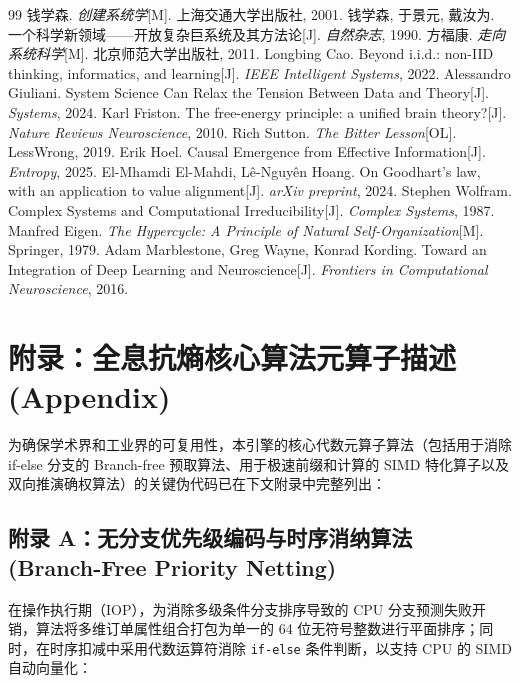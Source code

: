 \documentclass[11pt,a4paper]{article}
\begin{document}
\begin{thebibliography}{99}
 钱学森. \emph{创建系统学}[M]. 上海交通大学出版社, 2001.
 钱学森, 于景元, 戴汝为. 一个科学新领域——开放复杂巨系统及其方法论[J]. \emph{自然杂志}, 1990.
 方福康. \emph{走向系统科学}[M]. 北京师范大学出版社, 2011.
 Longbing Cao. Beyond i.i.d.: non-IID thinking, informatics, and learning[J]. \emph{IEEE Intelligent Systems}, 2022.
 Alessandro Giuliani. System Science Can Relax the Tension Between Data and Theory[J]. \emph{Systems}, 2024.
 Karl Friston. The free-energy principle: a unified brain theory?[J]. \emph{Nature Reviews Neuroscience}, 2010.
 Rich Sutton. \emph{The Bitter Lesson}[OL]. LessWrong, 2019.
 Erik Hoel. Causal Emergence from Effective Information[J]. \emph{Entropy}, 2025.
 El-Mhamdi El-Mahdi, Lê-Nguyên Hoang. On Goodhart's law, with an application to value alignment[J]. \emph{arXiv preprint}, 2024.
 Stephen Wolfram. Complex Systems and Computational Irreducibility[J]. \emph{Complex Systems}, 1987.
 Manfred Eigen. \emph{The Hypercycle: A Principle of Natural Self-Organization}[M]. Springer, 1979.
 Adam Marblestone, Greg Wayne, Konrad Kording. Toward an Integration of Deep Learning and Neuroscience[J]. \emph{Frontiers in Computational Neuroscience}, 2016.
\end{thebibliography}

\newpage
\section*{附录：全息抗熵核心算法元算子描述 (Appendix)}

为确保学术界和工业界的可复用性，本引擎的核心代数元算子算法（包括用于消除 if-else 分支的 Branch-free 预取算法、用于极速前缀和计算的 SIMD 特化算子以及双向推演确权算法）的关键伪代码已在下文附录中完整列出：

\subsection*{附录 A：无分支优先级编码与时序消纳算法 (Branch-Free Priority Netting)}

在操作执行期（IOP），为消除多级条件分支排序导致的 CPU 分支预测失败开销，算法将多维订单属性组合打包为单一的 64 位无符号整数进行平面排序；同时，在时序扣减中采用代数运算符消除 \texttt{if-else} 条件判断，以支持 CPU 的 SIMD 自动向量化：
\end{document}
